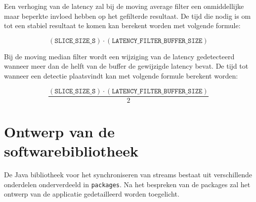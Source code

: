 Een verhoging van de latency zal bij de moving average filter een onmiddellijke maar beperkte invloed hebben op het gefilterde resultaat. De tijd die nodig is om tot een stabiel resultaat te komen kan berekent worden met volgende formule:

\begin{equation}
	(\texttt{SLICE\_SIZE\_S}) \cdot (\texttt{LATENCY\_FILTER\_BUFFER\_SIZE})
\end{equation}

Bij de moving median filter wordt een wijziging van de latency gedetecteerd wanneer meer dan de helft van de buffer de gewijzigde latency bevat. De tijd tot wanneer een detectie plaatsvindt kan met volgende formule berekent worden:

\begin{equation}
\frac{(\texttt{SLICE\_SIZE\_S}) \cdot (\texttt{LATENCY\_FILTER\_BUFFER\_SIZE})}{2}
\end{equation}

\section{Ontwerp van de softwarebibliotheek}
\label{ontwerp}

De Java bibliotheek voor het synchroniseren van streams bestaat uit verschillende onderdelen onderverdeeld in \texttt{packages}. Na het bespreken van de packages zal het ontwerp van de applicatie gedetailleerd worden toegelicht.

